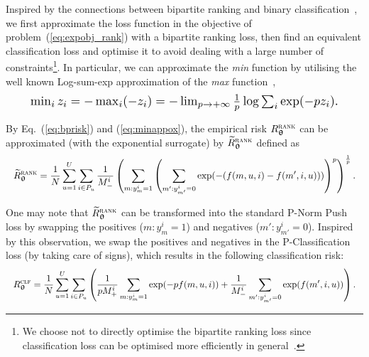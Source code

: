 Inspired by the connections between bipartite ranking and binary classification~\cite{ertekin2011equivalence,menon2016bipartite},
we first approximate the loss function in the objective of problem~(\ref{eq:expobj_rank}) with
a bipartite ranking loss, then find an equivalent classification loss and optimise it to 
avoid dealing with a large number of 
constraints\footnote{We choose not to directly optimise the bipartite ranking loss 
since classification loss can be optimised more efficiently in general~\cite{ertekin2011equivalence}.}.
%
In particular, 
we can approximate the \emph{min} function by utilising the well known Log-sum-exp approximation 
of the \emph{max} function~\cite[p. 72]{boyd2004convex},
\begin{equation}
\label{eq:minappox}
\resizebox{.9\columnwidth}{!}{$
\min_i z_i = -\max_i (-z_i) = -\lim_{p \to +\infty} \frac{1}{p} \log \sum_i \exp(-p z_i).
$}
\end{equation}

By Eq.~(\ref{eq:bprisk}) and (\ref{eq:minappox}), the empirical risk $R_{{\bm{\uptheta}}}^{\textsc{rank}}$ can be 
approximated (with the exponential surrogate) by $\widetilde R_{{\bm{\uptheta}}}^{\textsc{rank}}$ defined as
\begin{equation*}
\resizebox{\linewidth}{!}{$
\begin{aligned}
\widetilde R_{\upthetabm}^{\textsc{rank}}
= \frac{1}{N} \sum_{u=1}^U \sum_{i \in P_u} \frac{1}{M_-^i} \left( \sum_{m: y_m^i = 1} \left( \sum_{m': y_{m'}^i = 0} 
  \exp(-(f(m, u, i) - f(m', i, u))) \right)^p \right)^\frac{1}{p}.
\end{aligned}
$}
\end{equation*}


One may note that $\widetilde R_{{\bm{\uptheta}}}^{\textsc{rank}}$ can be transformed into the standard P-Norm Push loss by swapping the
positives ($m: y_m^i = 1$) and negatives ($m': y_{m'}^i = 0$). %
Inspired by this observation, we swap the positives and negatives in the P-Classification loss (by taking care of signs),
which results in the following classification risk:
\begin{equation*}
\resizebox{\linewidth}{!}{$\displaystyle
R_{\upthetabm}^{\textsc{clf}}
= \frac{1}{N} \sum_{u=1}^U \sum_{i \in P_u} \left(
  \frac{1}{p M_+^i} \sum_{m: y_m^i = 1} \exp(-p f(m, u, i))
  + \frac{1}{M_-^i} \sum_{m': y_{m'}^i = 0} \exp(f(m', i, u)) \right).
$}
\end{equation*}

